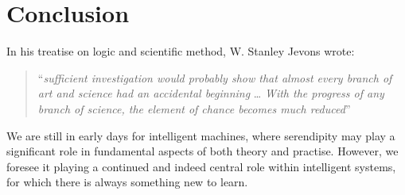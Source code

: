 \section{Conclusion} \label{sec:conclusion}

In his treatise on logic and scientific method, W. Stanley Jevons
wrote:
\begin{quote}
``\emph{sufficient investigation would probably show that almost every
    branch of art and science had an accidental beginning} \ldots
  \emph{With the progress of any branch of science, the element of
    chance becomes much reduced}'' \cite[p. 531]{jevons:1877}
\end{quote}
We are still in early days for intelligent machines, where serendipity
may play a significant role in fundamental aspects of both theory and
practise.  However, we foresee it playing a continued and indeed
central role within intelligent systems, for which there is always
something new to learn.
